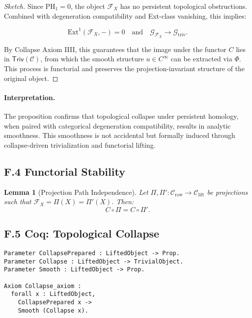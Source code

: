 \documentclass[11pt]{article}
\newtheorem{lemma}[theorem]{Lemma}
\begin{document}
\begin{proof}[Sketch]
Since \( \mathrm{PH}_1 = 0 \), the object \( \mathcal{F}_X \) has no persistent topological obstructions. Combined with degeneration compatibility and Ext-class vanishing, this implies:

\[
\mathrm{Ext}^1(\mathcal{F}_X, -) = 0 \quad \text{and} \quad \mathcal{G}_{\mathcal{F}_X} \longrightarrow \mathcal{G}_{\mathrm{triv}}.
\]

By Collapse Axiom IIII, this guarantees that the image under the functor \( C \) lies in \( \mathsf{Triv}(\mathcal{C}) \), from which the smooth structure \( u \in C^\infty \) can be extracted via \( \Phi \). This process is functorial and preserves the projection-invariant structure of the original object.
\end{proof}

\paragraph{Interpretation.} The proposition confirms that topological collapse under persistent homology, when paired with categorical degeneration compatibility, results in analytic smoothness. This smoothness is not accidental but formally induced through collapse-driven trivialization and functorial lifting.


\subsection*{F.4 Functorial Stability}

\begin{lemma}[Projection Path Independence]
Let \( \Pi, \Pi' : \mathcal{C}_{\mathrm{raw}} \to \mathcal{C}_{\mathrm{lift}} \) be projections such that \( \mathcal{F}_X = \Pi(X) = \Pi'(X) \). Then:
\[
C \circ \Pi = C \circ \Pi'.
\]
\end{lemma}

\subsection*{F.5 Coq: Topological Collapse}

\begin{lstlisting}[language=Coq, caption={Topological Collapse Structures}]
Parameter CollapsePrepared : LiftedObject -> Prop.
Parameter Collapse : LiftedObject -> TrivialObject.
Parameter Smooth : LiftedObject -> Prop.

Axiom Collapse_axiom :
  forall x : LiftedObject,
    CollapsePrepared x ->
    Smooth (Collapse x).
\end{lstlisting}
\end{document}
